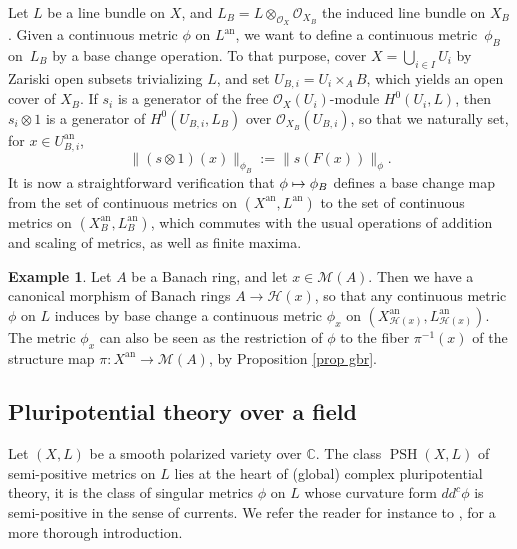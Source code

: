 \documentclass[JEP,XML,SOM,Unicode,published]{cedram}
\newcommand\mto{\mathchoice{\longmapsto}{\mapsto}{\mapsto}{\mapsto}}
\theoremstyle{definition}
\newtheorem{ex}[equation]{Example}
\newcommand \C{\mathbb C}
\newcommand \gO {\mathcal O}
\newcommand \M {\mathscr {M}}
\newcommand{\an}{\mathrm{an}}
\DeclareMathOperator{\PSH}{PSH}
\begin{document}
Let $L$ be a line bundle on $X$, and $L_B = L \otimes_{\gO_X} \gO_{X_B}$ the induced line bundle on $X_B$. Given a continuous metric $\phi$ on $L^{\an}$, we want to define a continuous metric~$\phi_B$ on~$L_B$ by a base change operation. To that purpose, cover $X = \bigcup_{i \in I} U_i$ by Zariski open subsets trivializing $L$, and set $U_{B, i} = U_i \times_A B$, which yields an open cover of $X_B$. If $s_i$ is a generator of the free $\gO_X(U_i)$-module $H^0(U_i, L)$, then $s_i \otimes 1$ is a generator of $H^0(U_{B, i}, L_B)$ over $\gO_{X_B}(U_{B, i})$, so that we naturally set, for $x \in U_{B, i}^{\an}$,
\[
\lVert (s \otimes 1)(x) \rVert_{\phi_B}:= \lVert s(F(x)) \rVert_{\phi}.
\]
It is now a straightforward verification that $\phi \mto \phi_B$ defines a base change map from the set of continuous metrics on $(X^{\an}, L^{\an})$ to the set of continuous metrics on $(X^{\an}_B, L_B^{\an})$, which commutes with the usual operations of addition and scaling of metrics, as well as finite maxima.
\begin{ex} Let $A$ be a Banach ring, and let $x \in \M(A)$. Then we have a canonical morphism of Banach rings $A \to \mathscr{H}(x)$, so that any continuous metric $\phi$ on $L$ induces by base change a continuous metric $\phi_x$ on $(X^{\an}_{\mathscr{H}(x)}, L^{\an}_{\mathscr{H}(x)})$. The metric $\phi_x$ can also be seen as the restriction of $\phi$ to the fiber $\pi^{-1}(x)$ of the structure map $\pi: X^{\an} \to \M(A)$, by Proposition \ref{prop gbr}.
\end{ex}
\subsection{Pluripotential theory over a field}
Let $(X,L)$ be a smooth polarized variety over $\C$. The class $\PSH(X, L)$ of semi-positive metrics on $L$ lies at the heart of (global) complex pluripotential theory, it is the class of singular metrics $\phi$ on $L$ whose curvature form $dd^c \phi$ is semi-positive in the sense of currents. We refer the reader for instance to \cite{DemB}, \cite{GZB} for a more thorough introduction.
\end{document}
